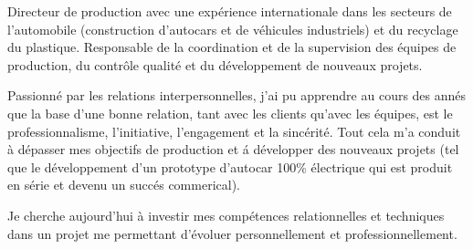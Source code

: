 
\begin{cvparagraph}
Directeur de production avec une expérience internationale dans les secteurs de l'automobile (construction d'autocars et de véhicules industriels) et du recyclage du plastique.
Responsable de la coordination et de la supervision des équipes de production, du contrôle qualité et du développement de nouveaux projets. 
\end{cvparagraph}

\begin{cvparagraph}
Passionné par les relations interpersonnelles, j'ai pu apprendre au cours des annés que la base d'une bonne relation, tant avec les clients qu'avec les équipes, est le professionnalisme, l'initiative, l'engagement et la sincérité. 
Tout cela m'a conduit à dépasser mes objectifs de production et á développer des nouveaux projets (tel que le développement d'un prototype d'autocar 100\% électrique qui est produit en série et devenu un succés commerical).
\end{cvparagraph}

\begin{cvparagraph}
Je cherche aujourd'hui à investir mes compétences relationnelles et techniques dans un projet me permettant d'évoluer personnellement et professionnellement.
\end{cvparagraph}